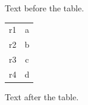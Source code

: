 \documentclass[12pt]{article}
\begin{document}
Text before the table.

\begin{longtable}{lc}
r1 & a\\
r2 & b\\
r3 & c\\
r4 & d\\
\end{longtable}

Text after the table.
\end{document}
